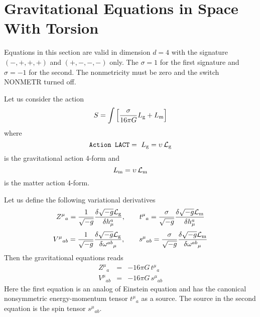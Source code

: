 \documentclass[twoside,openright]{report}
\newcommand{\grgtt}{\ttfamily}
\newcommand{\object}[2]{%
\begin{equation}
\mbox{\comm{#1}} =\ #2
\end{equation}}
\renewcommand{\tt}{\grgtt}
\newcommand{\comm}[1]{{\upshape\tt#1}}    %
\begin{document}
\section{Gravitational Equations in Space With Torsion}

Equations in this section are valid in dimension $d=4$
with the signature ${\scriptstyle(-,+,+,+)}$ and
${\scriptstyle(+,-,-,-)}$ only.
The $\sigma=1$ for the first signature and $\sigma=-1$
for the second. The nonmetricity must be zero and the
switch \comm{NONMETR} turned off.

Let us consider the action
\begin{equation}
S=\int\left[\frac{\sigma}{16\pi G}L_{\rm g}
+L_{\rm m}\right]
\end{equation}
where
\object{Action LACT}{L_{\rm g}=\upsilon\,{\cal L}_{\rm g}}
is the gravitational action 4-form and
\begin{equation}
L_{\rm m} = \upsilon\,{\cal L}_{\rm m}
\end{equation}
is the matter action 4-form.

Let us define the following variational derivatives
\begin{equation}
Z^\mu{}_{a} = \frac{1}{\sqrt{-g}}
\frac{\delta\sqrt{-g}{\cal L}_{\rm g}}{\delta h^a_\mu}
,\qquad
t^\mu{}_{a} = \frac{\sigma}{\sqrt{-g}}
\frac{\delta\sqrt{-g}{\cal L}_{\rm m}}{\delta h^a_\mu}
\end{equation}
\begin{equation}
V^\mu{}_{ab} = \frac{1}{\sqrt{-g}}
\frac{\delta\sqrt{-g}{\cal L}_{\rm g}}{\delta \omega^{ab}{}_\mu}
,\qquad
s^\mu{}_{ab} = \frac{\sigma}{\sqrt{-g}}
\frac{\delta\sqrt{-g}{\cal L}_{\rm m}}{\delta \omega^{ab}{}_\mu}
\end{equation}
Then the gravitational equations reads
\begin{eqnarray}
Z^\mu{}_a &=& -16\pi G\,t^\mu{}_a  \label{zma} \\[2mm]
V^\mu{}_{ab} &=& -16\pi G\,s^\mu{}_{ab}  \label{vab}
\end{eqnarray}
Here the first equation is an analog of Einstein equation
and has the canonical nonsymmetric energy-momentum
tensor $t^\mu{}_a$ as a source. The source in the second
equation is the spin tensor $s^\mu{}_{ab}$.
\end{document}
